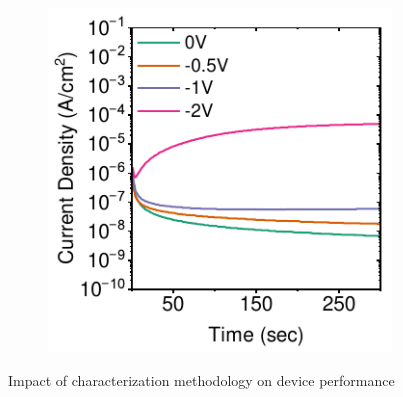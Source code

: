 \begin{figure}[htbp]
    \begin{subfigure}[b]{0.4\textwidth}
        \centering
        \includegraphics[width=\textwidth]{chapters/material_properties/images/Steady-State-plot.pdf}
        \caption{}
        \label{fig:ch2:steady_state}
    \end{subfigure}

    \caption{Impact of characterization methodology on device performance}
    \label{fig:ch2:types_of_measurement}
\end{figure}

